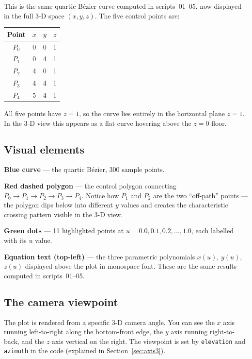 \documentclass[12pt, a4paper]{article}
\newcommand{\cd}[1]{\texttt{#1}}
\begin{document}
This is the same quartic B\'ezier curve computed in scripts~01--05,
now displayed in the full 3-D space $(x, y, z)$.
The five control points are:

\begin{center}
\begin{tabular}{cccc}
\toprule
Point & $x$ & $y$ & $z$ \\
\midrule
$P_0$ & 0 & 0 & 1 \\
$P_1$ & 0 & 4 & 1 \\
$P_2$ & 4 & 0 & 1 \\
$P_3$ & 4 & 4 & 1 \\
$P_4$ & 5 & 4 & 1 \\
\bottomrule
\end{tabular}
\end{center}

All five points have $z = 1$, so the curve lies entirely
in the horizontal plane $z = 1$.
In the 3-D view this appears as a flat curve hovering
above the $z = 0$ floor.

\subsection{Visual elements}

\textbf{Blue curve} --- the quartic B\'ezier, 300 sample points.

\textbf{Red dashed polygon} --- the control polygon connecting
$P_0 \to P_1 \to P_2 \to P_3 \to P_4$.
Notice how $P_1$ and $P_2$ are the two ``off-path'' points ---
the polygon dips below into different $y$ values and creates
the characteristic crossing pattern visible in the 3-D view.

\textbf{Green dots} --- 11 highlighted points at
$u = 0.0, 0.1, 0.2, \ldots, 1.0$,
each labelled with its $u$ value.

\textbf{Equation text (top-left)} --- the three parametric
polynomials $x(u)$, $y(u)$, $z(u)$ displayed above the plot
in monospace font.
These are the same results computed in scripts~01--05.

\subsection{The camera viewpoint}

The plot is rendered from a specific 3-D camera angle.
You can see the $x$ axis running left-to-right along the
bottom-front edge, the $y$ axis running right-to-back,
and the $z$ axis vertical on the right.
The viewpoint is set by \cd{elevation} and \cd{azimuth}
in the code (explained in Section~\ref{sec:axis3}).
\end{document}
